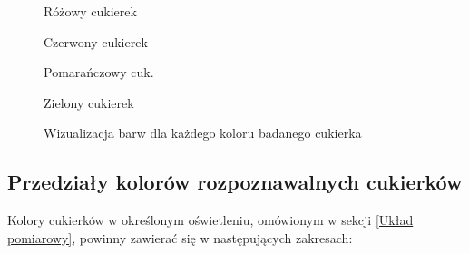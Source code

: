 \documentclass{article}
\begin{document}
\begin{figure}[H]
    \centering
    \begin{tcolorbox}[colback=white]

    \begin{multicols}{4}
    Różowy cukierek
    \begin{tcolorbox}[colback=my-pink-dark, width=\linewidth, colframe=my-pink-dark]
    \end{tcolorbox}
    Czerwony cukierek
    \begin{tcolorbox}[colback=my-red-dark, width=\linewidth, colframe=my-red-dark]
    \end{tcolorbox}
    Pomarańczowy cuk.
    \begin{tcolorbox}[colback=my-orange-dark, width=\linewidth, colframe=my-orange-dark]
    \end{tcolorbox}
    Zielony cukierek
    \begin{tcolorbox}[colback=my-green, width=\linewidth, colframe=my-green]
    \end{tcolorbox}
    \end{multicols}

    \begin{multicols}{4}
    \begin{tcolorbox}[colback=my-pink-light, width=\linewidth, colframe=my-pink-light]
    \end{tcolorbox}
    \begin{tcolorbox}[colback=my-red-light, width=\linewidth, colframe=my-red-light]
    \end{tcolorbox}
    \begin{tcolorbox}[colback=my-orange-light, width=\linewidth, colframe=my-orange-light]
    \end{tcolorbox}
    \end{multicols}

    \end{tcolorbox}
    \caption{Wizualizacja barw dla każdego koloru badanego cukierka}
\end{figure}






\subsection{Przedziały kolorów rozpoznawalnych cukierków}

Kolory cukierków w określonym oświetleniu, omówionym w sekcji \ref{Układ pomiarowy}, powinny zawierać się w następujących zakresach:
\end{document}
